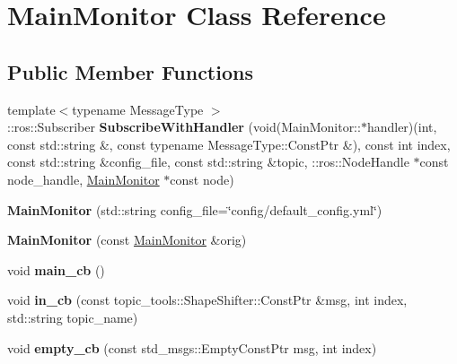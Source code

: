 \hypertarget{classMainMonitor}{}\section{Main\+Monitor Class Reference}
\label{classMainMonitor}
\subsection*{Public Member Functions}
\begin{DoxyCompactItemize}
\item 
\mbox{\label{classMainMonitor_a6a4d6f1cfcf64d7220a525e3c337ff8e}} 
{\footnotesize template$<$typename Message\+Type $>$ }\\\+::ros\+::\+Subscriber {\bfseries Subscribe\+With\+Handler} (void(Main\+Monitor\+::$\ast$handler)(int, const std\+::string \&, const typename Message\+Type\+::\+Const\+Ptr \&), const int index, const std\+::string \&config\+\_\+file, const std\+::string \&topic, \+::ros\+::\+Node\+Handle $\ast$const node\+\_\+handle, \hyperlink{classMainMonitor}{Main\+Monitor} $\ast$const node)
\item 
\mbox{\label{classMainMonitor_aa86ee65180f44ce5ad0c044433dd10ae}} 
{\bfseries Main\+Monitor} (std\+::string config\+\_\+file=\char`\"{}config/default\+\_\+config.\+yml\char`\"{})
\item 
\mbox{\label{classMainMonitor_a260d8cb58670574f16374c8f08025e2c}} 
{\bfseries Main\+Monitor} (const \hyperlink{classMainMonitor}{Main\+Monitor} \&orig)
\item 
\mbox{\label{classMainMonitor_a7b915b46f4d1ea5fd89f5e3f146281bf}} 
void {\bfseries main\+\_\+cb} ()
\item 
\mbox{\label{classMainMonitor_aa294654bdfa997521057cebcb5f75670}} 
void {\bfseries in\+\_\+cb} (const topic\+\_\+tools\+::\+Shape\+Shifter\+::\+Const\+Ptr \&msg, int index, std\+::string topic\+\_\+name)
\item 
\mbox{\label{classMainMonitor_ad0fe17196637bec51eff8b5b0aef1c4f}} 
void {\bfseries empty\+\_\+cb} (const std\+\_\+msgs\+::\+Empty\+Const\+Ptr msg, int index)
\item 

\end{DoxyCompactItemize}
